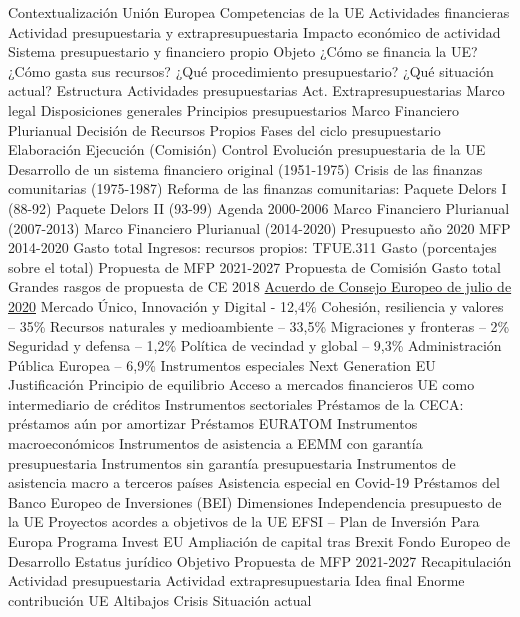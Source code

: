 \documentclass{nuevotema}
\begin{document}
\begin{esquema}[enumerate]
	\1[] 
		\2 Contextualización
			\3 Unión Europea
			\3 Competencias de la UE
			\3 Actividades financieras
			\3 Actividad presupuestaria y extrapresupuestaria
			\3 Impacto económico de actividad
			\3 Sistema presupuestario y financiero propio
		\2 Objeto
			\3 ¿Cómo se financia la UE?
			\3 ¿Cómo gasta sus recursos?
			\3 ¿Qué procedimiento presupuestario?
			\3 ¿Qué situación actual?
		\2 Estructura
			\3 Actividades presupuestarias
			\3 Act. Extrapresupuestarias
	\1 
		\2 Marco legal
			\3 Disposiciones generales
			\3 Principios presupuestarios
			\3 Marco Financiero Plurianual
			\3 Decisión de Recursos Propios
		\2 Fases del ciclo presupuestario
			\3 Elaboración
			\3 Ejecución (Comisión)
			\3 Control
		\2 Evolución presupuestaria de la UE
			\3 Desarrollo de un sistema financiero original (1951-1975)
			\3 Crisis de las finanzas comunitarias (1975-1987)
			\3 Reforma de las finanzas comunitarias: Paquete Delors I (88-92)
			\3 Paquete Delors II (93-99)
			\3 Agenda 2000-2006
			\3 Marco Financiero Plurianual (2007-2013)
			\3 Marco Financiero Plurianual (2014-2020)
			\3 Presupuesto año 2020
		\2 MFP 2014-2020
			\3 Gasto total
			\3 Ingresos: recursos propios: TFUE.311
			\3 Gasto (porcentajes sobre el total)
		\2 Propuesta de MFP 2021-2027
			\3 Propuesta de Comisión
			\3 Gasto total
			\3 Grandes rasgos de propuesta de CE 2018
			\3 \underline{Acuerdo de Consejo Europeo de julio de 2020}
			\3[1] Mercado Único, Innovación y Digital - 12,4\%
			\3[2] Cohesión, resiliencia y valores -- 35\%
			\3[3] Recursos naturales y medioambiente -- 33,5\%
			\3[4] Migraciones y fronteras -- 2\%
			\3[5] Seguridad y defensa -- 1,2\%
			\3[6] Política de vecindad y global -- 9,3\%
			\3[7] Administración Pública Europea -- 6,9\%
			\3[] Instrumentos especiales
			\3 Next Generation EU
	\1 
		\2 Justificación
			\3 Principio de equilibrio
			\3 Acceso a mercados financieros
			\3 UE como intermediario de créditos
		\2 Instrumentos sectoriales
			\3 Préstamos de la CECA: préstamos aún por amortizar
			\3 Préstamos EURATOM
		\2 Instrumentos macroeconómicos
			\3 Instrumentos de asistencia a EEMM con garantía presupuestaria
			\3 Instrumentos sin garantía presupuestaria
			\3 Instrumentos de asistencia macro a terceros países
			\3 Asistencia especial en Covid-19
		\2 Préstamos del Banco Europeo de Inversiones (BEI)
			\3 Dimensiones
			\3 Independencia presupuesto de la UE
			\3 Proyectos acordes a objetivos de la UE
			\3 EFSI -- Plan de Inversión Para Europa
			\3 Programa Invest EU
			\3 Ampliación de capital tras Brexit
		\2 Fondo Europeo de Desarrollo
			\3 Estatus jurídico
			\3 Objetivo
			\3 Propuesta de MFP 2021-2027
	\1[] 
		\2 Recapitulación
			\3 Actividad presupuestaria
			\3 Actividad extrapresupuestaria
		\2 Idea final
			\3 Enorme contribución UE
			\3 Altibajos \4 Crisis
			\3 Situación actual

\end{esquema}
\end{document}

